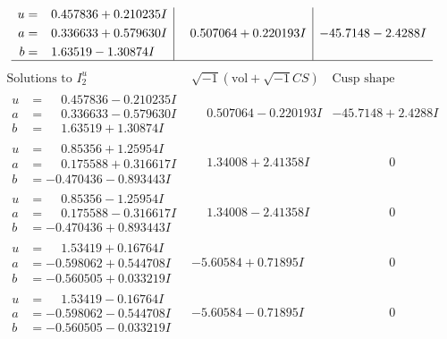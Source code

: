 \documentclass[1p]{elsarticle_modified}
\theoremstyle{definition}
\newcommand{\I}{\sqrt{-1}}
\begin{document}
$$\begin{array}{c|c|c}
\begin{aligned}
u &= \phantom{-}0.457836 + 0.210235 I \\
a &= \phantom{-}0.336633 + 0.579630 I \\
b &= \phantom{-}1.63519 - 1.30874 I\end{aligned}
 & \phantom{-}0.507064 + 0.220193 I & -45.7148 - 2.4288 I\\
 \hline 
 \end{array}$$\newpage$$\begin{array}{c|c|c}  
\text{Solutions to }I^u_{2}& \I (\text{vol} + \sqrt{-1}CS) & \text{Cusp shape}\\
 \hline 
\begin{aligned}
u &= \phantom{-}0.457836 - 0.210235 I \\
a &= \phantom{-}0.336633 - 0.579630 I \\
b &= \phantom{-}1.63519 + 1.30874 I\end{aligned}
 & \phantom{-}0.507064 - 0.220193 I & -45.7148 + 2.4288 I \\ \hline\begin{aligned}
u &= \phantom{-}0.85356 + 1.25954 I \\
a &= \phantom{-}0.175588 + 0.316617 I \\
b &= -0.470436 - 0.893443 I\end{aligned}
 & \phantom{-}1.34008 + 2.41358 I & \phantom{-0.000000 } 0 \\ \hline\begin{aligned}
u &= \phantom{-}0.85356 - 1.25954 I \\
a &= \phantom{-}0.175588 - 0.316617 I \\
b &= -0.470436 + 0.893443 I\end{aligned}
 & \phantom{-}1.34008 - 2.41358 I & \phantom{-0.000000 } 0 \\ \hline\begin{aligned}
u &= \phantom{-}1.53419 + 0.16764 I \\
a &= -0.598062 + 0.544708 I \\
b &= -0.560505 + 0.033219 I\end{aligned}
 & -5.60584 + 0.71895 I & \phantom{-0.000000 } 0 \\ \hline\begin{aligned}
u &= \phantom{-}1.53419 - 0.16764 I \\
a &= -0.598062 - 0.544708 I \\
b &= -0.560505 - 0.033219 I\end{aligned}
 & -5.60584 - 0.71895 I & \phantom{-0.000000 } 0 \\ \hline\begin{aligned}

\end{aligned}
\end{array}$$
\end{document}
